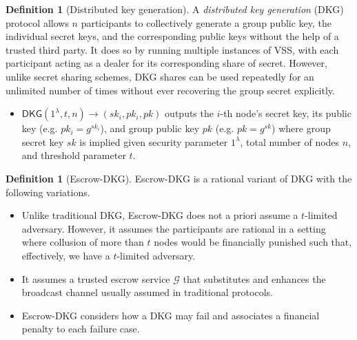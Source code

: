 \documentclass[letterpaper,twocolumn,10pt]{article}
\theoremstyle{definition}
\newtheorem{definition}[theorem]{Definition}
\theoremstyle{remark}
\begin{document}
\begin{definition}[Distributed key generation]
A \textit{distributed key generation} (DKG) \cite{pedersen1991threshold,gennaro1999secure,gennaro3revisiting} protocol allows $n$ participants to collectively generate a group public key, the individual secret keys, and the corresponding public keys without the help of a trusted third party. It does so by running multiple instances of VSS, with each participant acting as a dealer for its corresponding share of secret. However, unlike secret sharing schemes, DKG shares can be used repeatedly for an unlimited number of times without ever recovering the group secret explicitly.
\begin{itemize}
    \item $\mathsf{DKG}(1^\lambda, t, n) \rightarrow (sk_i, pk_i, pk)$ outputs the $i$-th node's secret key, its public key (e.g. $pk_i = g^{sk_i}$), and group public key $pk$ (e.g. $pk = g^{sk}$) where group secret key $sk$ is implied given security parameter $1^\lambda$, total number of nodes $n$, and threshold parameter $t$.
\end{itemize}
\end{definition}

\begin{definition}[Escrow-DKG]
Escrow-DKG \cite{david2019rational} is a rational variant of DKG with the following variations.
\begin{itemize}
    \item Unlike traditional DKG, Escrow-DKG does not a priori assume a $t$-limited adversary. However, it assumes the participants are rational in a setting where collusion of more than $t$ nodes would be financially punished such that, effectively, we have a $t$-limited adversary.
    \item It assumes a trusted escrow service $\mathcal{G}$ that substitutes and enhances the broadcast channel usually assumed in traditional protocols.
    \item Escrow-DKG considers how a DKG may fail and associates a financial penalty to each failure case.
\end{itemize}
\end{definition}
\end{document}
